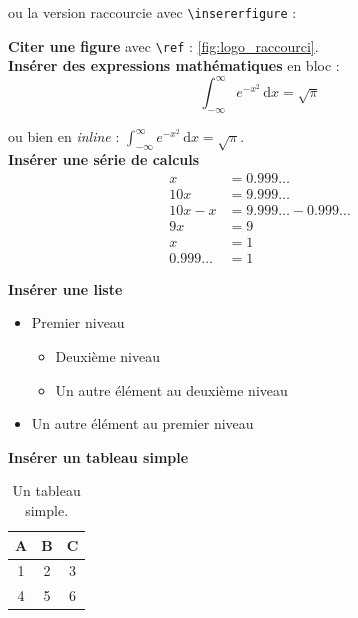 \documentclass{rapportECL}
\begin{document}
ou la version raccourcie avec \texttt{\textbackslash insererfigure} :

\textbf{Citer une figure} avec \texttt{\textbackslash ref} :
\ref{fig:logo_raccourci}.\\

\textbf{Insérer des expressions mathématiques} en bloc :
\begin{equation*}
  \int_{-\infty}^{\infty} e^{-x^2} \, \text{d}x = \sqrt{\pi}
\end{equation*}

ou bien en \textit{inline} : $\int_{-\infty}^{\infty} e^{-x^2} \,
\text{d}x = \sqrt{\pi}$.\\

\textbf{Insérer une série de calculs}
\begin{align*}
  x &= 0.999\ldots \\
  10x &= 9.999\ldots \\
  10x - x &= 9.999\ldots - 0.999\ldots \\
  9x &= 9 \\
  x &= 1 \\
  0.999\ldots &= 1
\end{align*}

\textbf{Insérer une liste}
\begin{itemize}
  \item Premier niveau
    \begin{itemize}
      \item Deuxième niveau
      \item Un autre élément au deuxième niveau
    \end{itemize}
  \item Un autre élément au premier niveau\\
\end{itemize}

\textbf{Insérer un tableau simple} \\
\begin{table}[H]
  \centering
  \begin{tabular}{|c|c|c|}
    \hline
    A & B & C \\
    \hline
    1 & 2 & 3 \\
    4 & 5 & 6 \\
    \hline
  \end{tabular}
  \caption{Un tableau simple.}
  \label{tab:tableau_simple}
\end{table}
\end{document}
